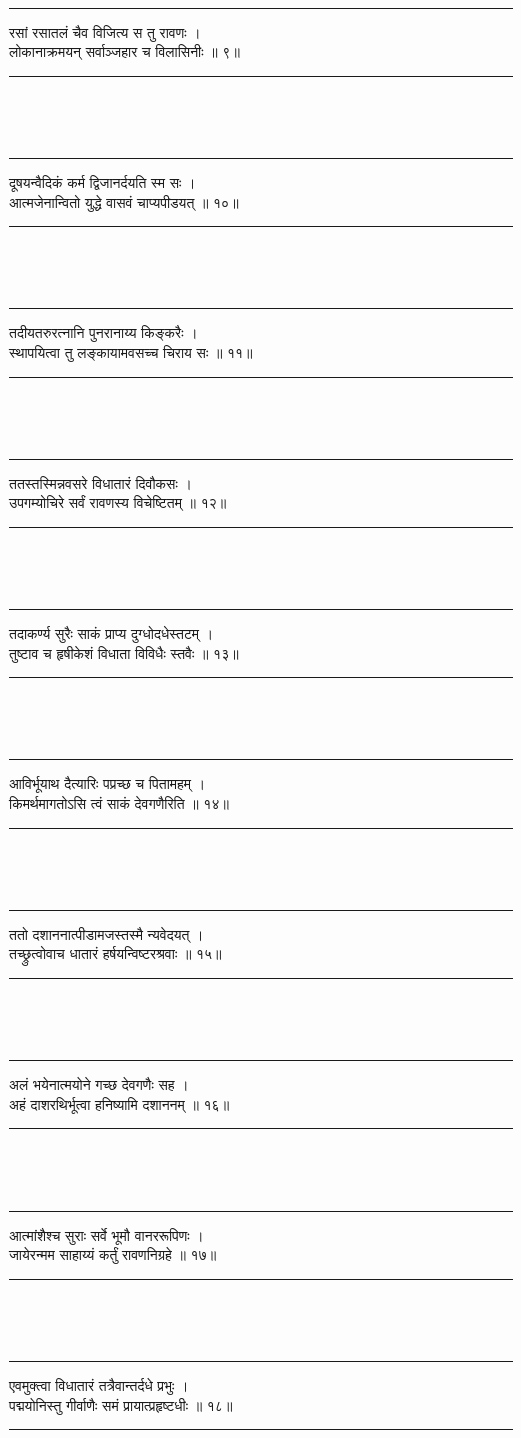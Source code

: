 \documentclass[a4paper,10pt]{report}
\newenvironment{moola}
{
~\\
\hrule
\begin{center}
\begin{LARGE}
}
{
\end{LARGE}
\end{center}
\hrule
~\\
}
\begin{document}
\begin{moola}
रसां रसातलं चैव विजित्य स तु रावणः ।\\
लोकानाक्रमयन् सर्वाञ्जहार च विलासिनीः ॥ ९॥
\end{moola}

\begin{moola}
दूषयन्वैदिकं कर्म द्विजानर्दयति स्म सः ।\\
आत्मजेनान्वितो युद्धे वासवं चाप्यपीडयत् ॥ १०॥
\end{moola}

\begin{moola}
तदीयतरुरत्नानि पुनरानाय्य किङ्करैः ।\\
स्थापयित्वा तु लङ्कायामवसच्च चिराय सः ॥ ११॥
\end{moola}

\begin{moola}
ततस्तस्मिन्नवसरे विधातारं दिवौकसः ।\\
उपगम्योचिरे सर्वं रावणस्य विचेष्टितम् ॥ १२॥
\end{moola}

\begin{moola}
तदाकर्ण्य सुरैः साकं प्राप्य दुग्धोदधेस्तटम् ।\\
तुष्टाव च हृषीकेशं विधाता विविधैः स्तवैः ॥ १३॥
\end{moola}

\begin{moola}
आविर्भूयाथ दैत्यारिः पप्रच्छ च पितामहम् ।\\
किमर्थमागतोऽसि त्वं साकं देवगणैरिति ॥ १४॥
\end{moola}

\begin{moola}
ततो दशाननात्पीडामजस्तस्मै न्यवेदयत् ।\\
तच्छ्रुत्वोवाच धातारं हर्षयन्विष्टरश्रवाः ॥ १५॥
\end{moola}

\begin{moola}
अलं भयेनात्मयोने गच्छ देवगणैः सह ।\\
अहं दाशरथिर्भूत्वा हनिष्यामि दशाननम् ॥ १६॥
\end{moola}

\begin{moola}
आत्मांशैश्च सुराः सर्वे भूमौ वानररूपिणः ।\\
जायेरन्मम साहाय्यं कर्तुं रावणनिग्रहे ॥ १७॥
\end{moola}

\begin{moola}
एवमुक्त्वा विधातारं तत्रैवान्तर्दधे प्रभुः ।\\
पद्मयोनिस्तु गीर्वाणैः समं प्रायात्प्रहृष्टधीः ॥ १८॥
\end{moola}
\end{document}
